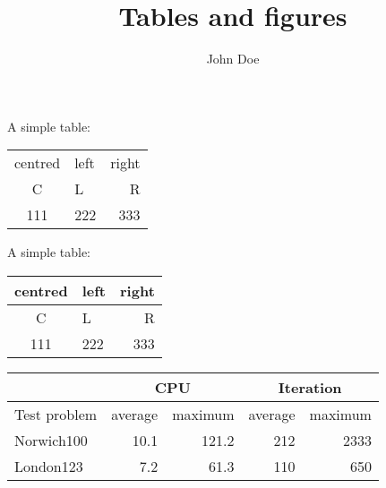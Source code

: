 \documentclass[12pt]{scrartcl}
\title{Tables and figures}
\author{John Doe}
\begin{document}
\maketitle

A simple table:
\begin{center}
	\begin{tabular}{clr}
		centred & left & right \\
		C & L & R \\
		111 & 222 & 333
	\end{tabular}
\end{center}


A simple table:
\begin{center}
	\begin{tabular}{clr} \hline
		centred & left & right \\ \hline\hline
		C & L & R \\
		111 & 222 & 333 \\ \hline
	\end{tabular}
\end{center}

\begin{center}
	\begin{tabular}{|l|r|r|r|r|} \cline{2-5}
		\multicolumn{1}{c}{} & \multicolumn{2}{|c|}{CPU} &
		\multicolumn{2}{|c|}{Iteration} \\ \hline
		Test problem & average & maximum & average & maximum \\
		\hline \hline
		Norwich100 & 10.1 & 121.2 & 212 & 2333 \\
		London123 & 7.2 & 61.3 & 110 & 650 \\
		\hline
	\end{tabular}
\end{center}
\end{document}
